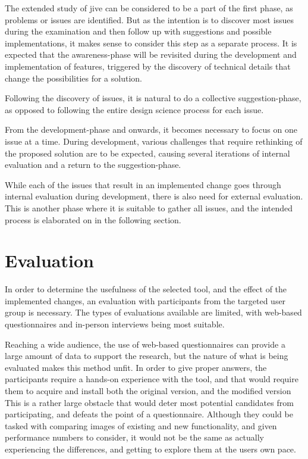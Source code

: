 The extended study of \gls{jive} can be considered to be a part of the first phase, as problems or issues are identified.
But as the intention is to discover most issues during the examination and then follow up with suggestions and possible implementations, it makes sense to consider this step as a separate process.
It is expected that the awareness-phase will be revisited during the development and implementation of features, triggered by the discovery of technical details that change the possibilities for a solution.

Following the discovery of issues, it is natural to do a collective suggestion-phase, as opposed to following the entire design science process for each issue.

From the development-phase and onwards, it becomes necessary to focus on one issue at a time.
During development, various challenges that require rethinking of the proposed solution are to be expected, causing several iterations of internal evaluation and a return to the suggestion-phase.

While each of the issues that result in an implemented change goes through internal evaluation during development, there is also need for external evaluation.
This is another phase where it is suitable to gather all issues, and the intended process is elaborated on in the following section.





\section{Evaluation}\label{methEval}

In order to determine the usefulness of the selected tool, and the effect of the implemented changes, an evaluation with participants from the targeted user group is necessary.
The types of evaluations available are limited, with web-based questionnaires and in-person interviews being most suitable.

Reaching a wide audience, the use of web-based questionnaires can provide a large amount of data to support the research, but the nature of what is being evaluated makes this method unfit.
In order to give proper answers, the participants require a hands-on experience with the tool, and that would require them to acquire and install both the original version, and the modified version
This is a rather large obstacle that would deter most potential candidates from participating, and defeats the point of a questionnaire.
Although they could be tasked with comparing images of existing and new functionality, and given performance numbers to consider, it would not be the same as actually experiencing the differences, and getting to explore them at the users own pace.


